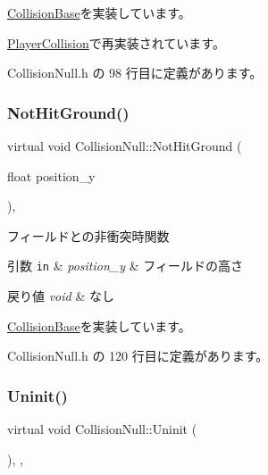 \mbox{\hyperlink{class_collision_base_a9b64fc5c3f2aac2a05296985ef799fb1}{Collision\+Base}}を実装しています。



\mbox{\hyperlink{class_player_collision_a21b8f825ea142024212ab5fe3f427ab0}{Player\+Collision}}で再実装されています。



 Collision\+Null.\+h の 98 行目に定義があります。

\mbox{\label{class_collision_null_ad456a03a3e3d55d8d408b7ed28ce7911}} 
\subsubsection{\texorpdfstring{Not\+Hit\+Ground()}{NotHitGround()}}
{\footnotesize\ttfamily virtual void Collision\+Null\+::\+Not\+Hit\+Ground (\begin{DoxyParamCaption}\item[{float}]{position\+\_\+y }\end{DoxyParamCaption})\hspace{0.3cm}{\ttfamily [inline]}, {\ttfamily [virtual]}}



フィールドとの非衝突時関数 


\begin{DoxyParams}[1]{引数}
\mbox{\tt in}  & {\em position\+\_\+y} & フィールドの高さ \\
\hline
\end{DoxyParams}

\begin{DoxyRetVals}{戻り値}
{\em void} & なし \\
\hline
\end{DoxyRetVals}


\mbox{\hyperlink{class_collision_base_ac1ed5b1c0c9b6b70b432e6656f9c4b45}{Collision\+Base}}を実装しています。



 Collision\+Null.\+h の 120 行目に定義があります。

\mbox{\label{class_collision_null_a7c6d0ec502efc55e2f406415451152f5}} 
\subsubsection{\texorpdfstring{Uninit()}{Uninit()}}
{\footnotesize\ttfamily virtual void Collision\+Null\+::\+Uninit (\begin{DoxyParamCaption}{ }\end{DoxyParamCaption})\hspace{0.3cm}{\ttfamily [inline]}, {\ttfamily [override]}, {\ttfamily [virtual]}}



